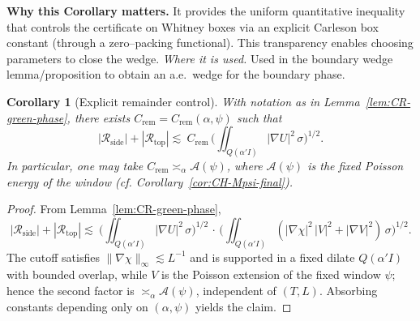 \documentclass[11pt]{article}
\newtheorem{corollary}{Corollary}[section]
\theoremstyle{definition}
\theoremstyle{remark}
\begin{document}
\vspace{1.0cm}
\noindent\textbf{Why this Corollary matters.} It provides the uniform quantitative inequality that controls the certificate on Whitney boxes via an explicit Carleson box constant (through a zero--packing functional). This transparency enables choosing parameters to close the wedge.
\noindent\textit{Where it is used.} Used in the boundary wedge lemma/proposition to obtain an a.e.\ wedge for the boundary phase.
\begin{corollary}[Explicit remainder control]
With notation as in Lemma~\ref{lem:CR-green-phase}, there exists $C_{\mathrm{rem}}=C_{\mathrm{rem}}(\alpha,\psi)$ such that
\[
  |\mathcal R_{\mathrm{side}}|+|\mathcal R_{\mathrm{top}}|
 \lesssim\ C_{\mathrm{rem}}\,\Big(\iint_{Q(\alpha'I)} |\nabla U|^2\,\sigma\Big)^{1/2}.
\]
In particular, one may take $C_{\mathrm{rem}}\asymp_\alpha \mathcal A(\psi)$, where $\mathcal A(\psi)$ is the fixed Poisson energy of the window (cf. Corollary~\ref{cor:CH-Mpsi-final}).
\end{corollary}
\begin{proof}
From Lemma~\ref{lem:CR-green-phase},
\[
  |\mathcal R_{\mathrm{side}}|+|\mathcal R_{\mathrm{top}}| \lesssim\ \Big(\iint_{Q(\alpha'I)} |\nabla U|^2\,\sigma\Big)^{1/2}\,\cdot\,\Big(\iint_{Q(\alpha'I)} (|\nabla\chi|^2\,|V|^2+|\nabla V|^2)\,\sigma\Big)^{1/2}.
\]
The cutoff satisfies $\|\nabla\chi\|_\infty\lesssim L^{-1}$ and is supported in a fixed dilate $Q(\alpha' I)$ with bounded overlap, while $V$ is the Poisson extension of the fixed window $\psi$; hence the second factor is $\asymp_\alpha \mathcal A(\psi)$, independent of $(T,L)$. Absorbing constants depending only on $(\alpha,\psi)$ yields the claim.
\end{proof}
\end{document}
